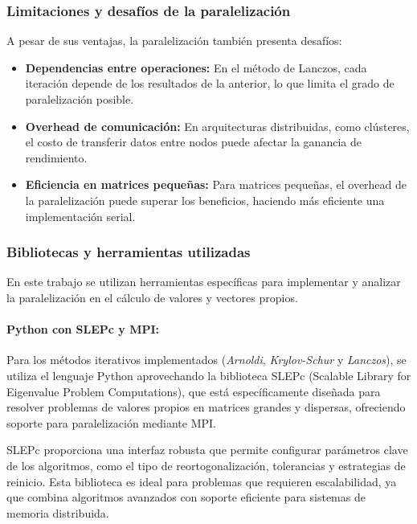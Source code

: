 \documentclass{article}
\begin{document}
\subsubsection{Limitaciones y desafíos de la paralelización}
A pesar de sus ventajas, la paralelización también presenta desafíos:
\begin{itemize}
    \item \textbf{Dependencias entre operaciones:} En el método de Lanczos, cada iteración depende de los resultados de la anterior, lo que limita el grado de paralelización posible.
    \item \textbf{Overhead de comunicación:} En arquitecturas distribuidas, como clústeres, el costo de transferir datos entre nodos puede afectar la ganancia de rendimiento.
    \item \textbf{Eficiencia en matrices pequeñas:} Para matrices pequeñas, el overhead de la paralelización puede superar los beneficios, haciendo más eficiente una implementación serial.
\end{itemize}



\subsubsection{Bibliotecas y herramientas utilizadas}

En este trabajo se utilizan herramientas específicas para implementar y analizar la paralelización en el cálculo de valores y vectores propios. 

\paragraph{ Python con SLEPc y MPI:}
Para los métodos iterativos implementados (\textit{Arnoldi}, \textit{Krylov-Schur} y \textit{Lanczos}), se utiliza el lenguaje Python aprovechando la biblioteca SLEPc (Scalable Library for Eigenvalue Problem Computations), que está específicamente diseñada para resolver problemas de valores propios en matrices grandes y dispersas, ofreciendo soporte para paralelización mediante MPI. 

SLEPc proporciona una interfaz robusta que permite configurar parámetros clave de los algoritmos, como el tipo de reortogonalización, tolerancias y estrategias de reinicio. Esta biblioteca es ideal para problemas que requieren escalabilidad, ya que combina algoritmos avanzados con soporte eficiente para sistemas de memoria distribuida.
\end{document}
